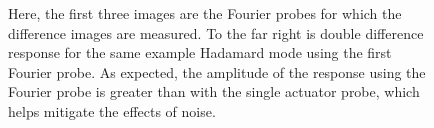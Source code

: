 \documentclass[12pt]{spieman}  %
\begin{document}
\begin{spacing}{2}
\begin{figure}[h]
    \centering
    \caption{Here, the first three images are the Fourier probes for which the difference images are measured. To the far right is double difference response for the same example Hadamard mode using the first Fourier probe. As expected, the amplitude of the response using the Fourier probe is greater than with the single actuator probe, which helps mitigate the effects of noise.}
    \label{fig:spc-band4b-fourier-probe-examples}
\end{figure}


\end{spacing}
\end{document}
